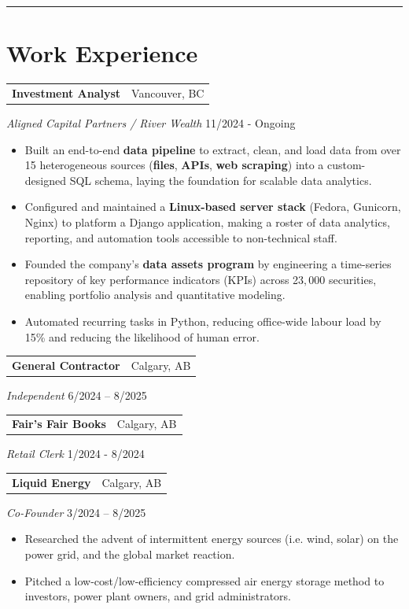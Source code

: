 \documentclass[a4paper,10pt]{article}
\makeatletter
\newcommand{\work}[5]{
	{
		\vspace{1.5mm}
		\noindent
		\begin{tabular*}{\textwidth}{@{\extracolsep{\fill}} l r}
			\textbf{#1} & #2 \\
		\end{tabular*}
		\vspace{-5mm}
		\textit{#3} \hfill #4 \\
		\begin{itemize}
			\setlength{\itemsep}{-1mm}
			\setlength{\topsep}{0mm}
			\setlength{\parsep}{0mm}
			#5
		\end{itemize}
	}
}
\newcommand{\workbrief}[4]{
	{
		\vspace{1.5mm}
		\noindent
		\begin{tabular*}{\textwidth}{@{\extracolsep{\fill}} l r}
			\textbf{#1} & #2 \\
		\end{tabular*}
		\vspace{-5mm}
		\textit{#3} \hfill #4 \\
		\vspace{1.8mm}
	}
}
\makeatother
\begin{document}
	
\noindent\rule{\textwidth}{0.4pt}
\section*{Work Experience}
	
	\work
	{Investment Analyst}
	{Vancouver, BC}
	{Aligned Capital Partners / River Wealth}
	{11/2024 - Ongoing}
	{
		
		\item Built an end-to-end \textbf{data pipeline} to extract, clean, and load data from over 15 heterogeneous sources (\textbf{files}, \textbf{APIs}, \textbf{web scraping}) into a custom-designed SQL schema, laying the foundation for scalable data analytics.
		
		\item Configured and maintained a \textbf{Linux-based server stack} (Fedora, Gunicorn, Nginx) to platform a Django application, making a roster of data analytics, reporting, and automation tools accessible to non-technical staff.
		
		\item Founded the company's \textbf{data assets program} by engineering a time-series repository of key performance indicators (KPIs) across 23$,$000 securities, enabling portfolio analysis and quantitative modeling.
		
		\item Automated recurring tasks in Python, reducing office-wide labour load by 15\% and reducing the likelihood of human error.
	}

	\workbrief
	{General Contractor}
	{Calgary, AB}
	{Independent}
	{6/2024 – 8/2025}
	
	\workbrief
	{Fair's Fair Books}
	{Calgary, AB}
	{Retail Clerk}
	{1/2024 - 8/2024}
	
	
	\work
	{Liquid Energy}
	{Calgary, AB}
	{Co-Founder}
	{3/2024 – 8/2025}
	{
		\item Researched the advent of intermittent energy sources (i.e. wind, solar) on the power grid, and the global market reaction.
		\item Pitched a low-cost/low-efficiency compressed air energy storage method to investors, power plant owners, and grid administrators.
	}
	
\end{document}
